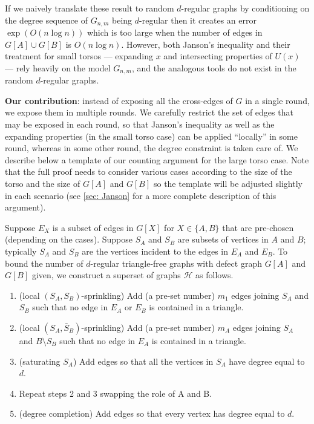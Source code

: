 \documentclass[11pt]{article}
\theoremstyle{plain}
\begin{document}
If we naively translate these result to random $d$-regular graphs by conditioning on the degree sequence of $G_{n,m}$ being $d$-regular then it creates an error $\exp(O(n\log n))$ which is too large when the number of edges in $G[A]\cup G[B]$ is $O(n\log n)$. However, both Janson's inequality and their treatment for small torsos --- expanding $x$ and intersecting properties of $U(x)$ --- rely heavily on the model $G_{n,m}$, and the analogous tools do not exist in the random $d$-regular graphs.

{\bf Our contribution}: instead of exposing all the cross-edges of $G$ in a single round, we expose them in multiple rounds. We carefully restrict the set of edges that may be exposed in each round, so that Janson's inequality as well as the expanding properties (in the small torso case) can be applied ``locally'' in some round, whereas in some other round, the degree constraint is taken care of. We describe below a template of our counting argument for the large torso case. Note that the full proof needs to consider various cases according to the size of the torso and the size of $G[A]$ and $G[B]$ so the template will be adjusted slightly in each scenario (see \cref{sec: Janson} for a more complete description of this argument).

Suppose $E_X$ is a subset of edges in $G[X]$ for $X\in \{A,B\}$ that are pre-chosen (depending on the cases). Suppose $S_A$ and $S_B$ are subsets of vertices in $A$ and $B$; typically $S_A$ and $S_B$ are the vertices incident to the edges in $E_A$ and $E_B$. To bound the number of $d$-regular triangle-free
graphs with defect graph $G[A]$ and $G[B]$ given, we construct a superset of graphs ${\mathcal H}$ 
as follows.
\begin{enumerate}
    \item (local $(S_A,S_B)$-sprinkling) Add (a pre-set number) $m_1$ edges joining $S_A$ and $S_B$ such that no edge in $E_A$ or $E_B$ is contained in a triangle.
    \item (local $(S_A,\bar S_B)$-sprinkling) Add (a pre-set number) $m_A$ edges joining $S_A$ and $B\setminus S_B$ such that no edge in $E_A$ is contained in a triangle.
    \item (saturating $S_A$) Add edges so that all the vertices in $S_A$ have degree equal to $d$.
    \item Repeat steps 2 and 3 swapping the role of A and B.\
    \item (degree completion) Add edges so that every vertex has degree equal to $d$.
\end{enumerate}
\end{document}

